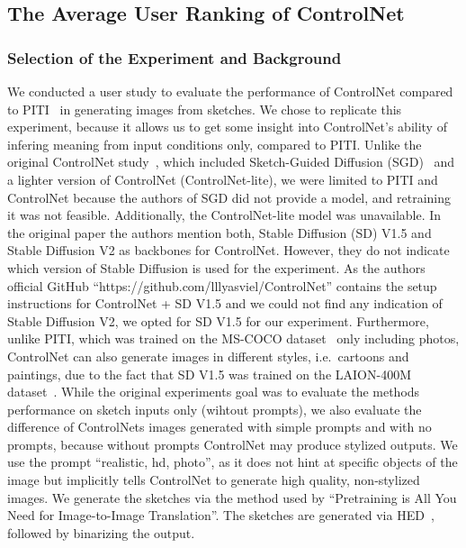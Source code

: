 \subsection{The Average User Ranking of ControlNet}
\subsubsection{Selection of the Experiment and Background}
We conducted a user study to evaluate the performance of ControlNet compared to PITI~\cite{wang2022pretrainingneedimagetoimagetranslation} in generating images from sketches. We chose to replicate this experiment, because it allows us to get some insight into ControlNet's ability of infering meaning from input conditions only, compared to PITI.
Unlike the original ControlNet study~\cite{zhang2023addingconditionalcontroltexttoimage}, which included Sketch-Guided Diffusion (SGD)~\cite{voynov2022sketchguidedtexttoimagediffusionmodels} and a lighter version of ControlNet (ControlNet-lite), we were limited to PITI and ControlNet because the authors of SGD did not provide a model, and retraining it was not feasible. Additionally, the ControlNet-lite model was unavailable. In the original paper the authors mention both, Stable Diffusion (SD) V1.5 and Stable Diffusion V2 as backbones for ControlNet. However, they do not indicate which version of Stable Diffusion is used for the experiment. As the authors official GitHub ``https://github.com/lllyasviel/ControlNet'' contains the setup instructions for ControlNet + SD V1.5 and we could not find any indication of Stable Diffusion V2, we opted for SD V1.5 for our experiment. Furthermore, unlike PITI, which was trained on the MS-COCO dataset~\cite{lin2015microsoftcococommonobjects} only including photos, ControlNet can also generate images in different styles, i.e.\ cartoons and paintings, due to the fact that SD V1.5 was trained on the LAION-400M dataset~\cite{schuhmann2021laion400mopendatasetclipfiltered}. While the original experiments goal was to evaluate the methods performance on sketch inputs only (wihtout prompts), we also evaluate the difference of ControlNets images generated with simple prompts and with no prompts, because without prompts ControlNet may produce stylized outputs. We use the prompt ``realistic, hd, photo'', as it does not hint at specific objects of the image but implicitly tells ControlNet to generate high quality, non-stylized images. We generate the sketches via the method used by ``Pretraining is All You Need for Image-to-Image
Translation''. The sketches are generated via HED~\cite{xie2015holisticallynestededgedetection}, followed by binarizing the output.

